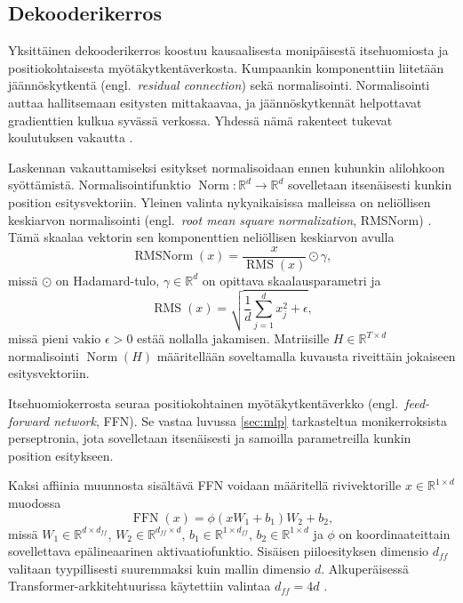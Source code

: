 \subsection{Dekooderikerros}

Yksittäinen dekooderikerros koostuu kausaalisesta monipäisestä
itsehuomiosta ja positiokohtaisesta myötäkytkentäverkosta.
Kumpaankin komponenttiin liitetään jäännöskytkentä
(engl.\ \emph{residual connection}) sekä normalisointi.
Normalisointi auttaa hallitsemaan esitysten mittakaavaa,
ja jäännöskytkennät helpottavat gradienttien kulkua syvässä
verkossa. Yhdessä nämä rakenteet tukevat koulutuksen
vakautta \cite{he2016deep, ba2016layer, vaswani2017attention}.

Laskennan vakauttamiseksi esitykset normalisoidaan ennen kuhunkin
alilohkoon syöttämistä. Normalisointifunktio \(\operatorname{Norm} \colon
\mathbb{R}^{d} \to \mathbb{R}^{d}\) sovelletaan itsenäisesti kunkin position
esitysvektoriin. Yleinen valinta nykyaikaisissa malleissa on neliöllisen
keskiarvon normalisointi (engl.\ \emph{root mean square normalization},
RMSNorm) \cite{zhang2019root}. Tämä skaalaa vektorin sen komponenttien neliöllisen keskiarvon avulla
$$
\operatorname{RMSNorm}(x) = \frac{x}{\operatorname{RMS}(x)} \odot \gamma,
$$
missä \(\odot\) on Hadamard-tulo, \(\gamma \in \mathbb{R}^d\)
on opittava skaalausparametri ja
$$
\operatorname{RMS}(x) = \sqrt{\frac{1}{d} \sum_{j=1}^{d} x_j^2 + \epsilon},
$$
missä pieni vakio \(\epsilon > 0\) estää nollalla jakamisen. Matriisille
\(H \in \mathbb{R}^{T \times d}\) normalisointi \(\operatorname{Norm}(H)\)
määritellään soveltamalla kuvausta riveittäin jokaiseen esitysvektoriin.

Itsehuomiokerrosta seuraa positiokohtainen myötäkytkentäverkko
(engl.\ \emph{feed-forward network}, FFN). Se vastaa
luvussa \ref{sec:mlp} tarkasteltua monikerroksista
perseptronia, jota sovelletaan itsenäisesti ja samoilla
parametreilla kunkin position esitykseen.

Kaksi affiinia muunnosta sisältävä FFN voidaan määritellä
rivivektorille \(x \in \mathbb{R}^{1 \times d}\) muodossa
$$
\operatorname{FFN}(x)
=
\phi(x W_1 + b_1) W_2 + b_2,
$$
missä \(W_1 \in \mathbb{R}^{d \times d_{ff}}\),
\(W_2 \in \mathbb{R}^{d_{ff} \times d}\),
\(b_1 \in \mathbb{R}^{1 \times d_{ff}}\),
\(b_2 \in \mathbb{R}^{1 \times d}\) ja \(\phi\) on
koordinaateittain sovellettava epälineaarinen aktivaatiofunktio.
Sisäisen piiloesityksen dimensio \(d_{ff}\) valitaan
tyypillisesti suuremmaksi kuin mallin dimensio \(d\).
Alkuperäisessä Transformer-arkkitehtuurissa käytettiin
valintaa \(d_{ff} = 4d\) \cite{vaswani2017attention}.

